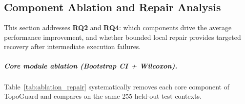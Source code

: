 \documentclass[manuscript,review,anonymous]{acmart}
\begin{document}
\begin{table}[t]
\centering
\caption{Auxiliary transfer results on Storm Surge. The noise-perturbed contexts provide supporting evidence rather than full-scale cross-domain validation.}
\label{tab:storm_transfer}
\end{table}


\subsection{Component Ablation and Repair Analysis}
\label{subsec:ablation_repair}

This section addresses \textbf{RQ2} and \textbf{RQ4}: which components drive the average performance improvement, and whether bounded local repair provides targeted recovery after intermediate execution failures.

\subparagraph{Core module ablation (Bootstrap CI + Wilcoxon).}
Table~\ref{tab:ablation_repair} systematically removes each core component of TopoGuard and compares on the same 255 held-out test contexts.

\begin{table}[t]
\centering
\caption{Core module ablation on Water QA. $\Delta S$ denotes the quality difference between the full system and each ablated variant.}
\label{tab:ablation_repair}
\end{table}
\end{document}
